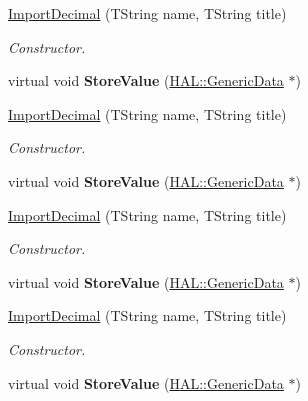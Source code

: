 \begin{DoxyCompactItemize}
\item 
\hyperlink{class_h_a_l_1_1_algorithms_1_1_import_decimal_a15781bef55e9a3ff8de1ec1f64a94ff5}{Import\+Decimal} (T\+String name, T\+String title)
\begin{DoxyCompactList}\small\item\em Constructor. \end{DoxyCompactList}\item 
\hypertarget{class_h_a_l_1_1_algorithms_1_1_import_decimal_a3044dabc75bee09871d80f32333e730f}{virtual void {\bfseries Store\+Value} (\hyperlink{class_h_a_l_1_1_generic_data}{H\+A\+L\+::\+Generic\+Data} $\ast$)}\label{class_h_a_l_1_1_algorithms_1_1_import_decimal_a3044dabc75bee09871d80f32333e730f}

\item 
\hyperlink{class_h_a_l_1_1_algorithms_1_1_import_decimal_a15781bef55e9a3ff8de1ec1f64a94ff5}{Import\+Decimal} (T\+String name, T\+String title)
\begin{DoxyCompactList}\small\item\em Constructor. \end{DoxyCompactList}\item 
\hypertarget{class_h_a_l_1_1_algorithms_1_1_import_decimal_a3044dabc75bee09871d80f32333e730f}{virtual void {\bfseries Store\+Value} (\hyperlink{class_h_a_l_1_1_generic_data}{H\+A\+L\+::\+Generic\+Data} $\ast$)}\label{class_h_a_l_1_1_algorithms_1_1_import_decimal_a3044dabc75bee09871d80f32333e730f}

\item 
\hyperlink{class_h_a_l_1_1_algorithms_1_1_import_decimal_a15781bef55e9a3ff8de1ec1f64a94ff5}{Import\+Decimal} (T\+String name, T\+String title)
\begin{DoxyCompactList}\small\item\em Constructor. \end{DoxyCompactList}\item 
\hypertarget{class_h_a_l_1_1_algorithms_1_1_import_decimal_a3044dabc75bee09871d80f32333e730f}{virtual void {\bfseries Store\+Value} (\hyperlink{class_h_a_l_1_1_generic_data}{H\+A\+L\+::\+Generic\+Data} $\ast$)}\label{class_h_a_l_1_1_algorithms_1_1_import_decimal_a3044dabc75bee09871d80f32333e730f}

\item 
\hyperlink{class_h_a_l_1_1_algorithms_1_1_import_decimal_a15781bef55e9a3ff8de1ec1f64a94ff5}{Import\+Decimal} (T\+String name, T\+String title)
\begin{DoxyCompactList}\small\item\em Constructor. \end{DoxyCompactList}\item 
\hypertarget{class_h_a_l_1_1_algorithms_1_1_import_decimal_a3044dabc75bee09871d80f32333e730f}{virtual void {\bfseries Store\+Value} (\hyperlink{class_h_a_l_1_1_generic_data}{H\+A\+L\+::\+Generic\+Data} $\ast$)}\label{class_h_a_l_1_1_algorithms_1_1_import_decimal_a3044dabc75bee09871d80f32333e730f}


\end{DoxyCompactItemize}

